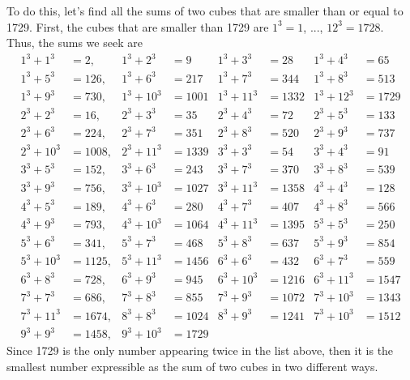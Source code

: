 \begin{solution}
    To do this, let's find all the sums of two cubes that are smaller than or equal to 1729. First, the cubes that are smaller than 1729 are $1^3 = 1$, ..., $12^3 = 1728$. Thus, the sums we seek are
    \begin{align*}
        1^3 + 1^3 &= 2, & 1^3 + 2^3 &= 9 & 1^3 + 3^3 &= 28 & 1^3 + 4^3 &= 65 \\
        1^3 + 5^3 &= 126, & 1^3 + 6^3 &= 217 & 1^3 + 7^3 &= 344 & 1^3 + 8^3 &= 513 \\
        1^3 + 9^3 &= 730, & 1^3 + 10^3 &= 1001 & 1^3 + 11^3 &= 1332 & 1^3 + 12^3 &= 1729 \\
        2^3 + 2^3 &= 16, & 2^3 + 3^3 &= 35 & 2^3 + 4^3 &= 72 & 2^3 + 5^3 &= 133 \\
        2^3 + 6^3 &= 224, & 2^3 + 7^3 &= 351 & 2^3 + 8^3 &= 520 & 2^3 + 9^3 &= 737 \\
        2^3 + 10^3 &= 1008, & 2^3 + 11^3 &= 1339 & 3^3 + 3^3 &= 54 & 3^3 + 4^3 &= 91 \\
        3^3 + 5^3 &= 152, & 3^3 + 6^3 &= 243 & 3^3 + 7^3 &= 370 & 3^3 + 8^3 &= 539 \\
        3^3 + 9^3 &= 756, & 3^3 + 10^3 &= 1027 & 3^3 + 11^3 &= 1358 & 4^3 + 4^3 &= 128 \\
        4^3 + 5^3 &= 189, & 4^3 + 6^3 &= 280 & 4^3 + 7^3 &= 407 & 4^3 + 8^3 &= 566 \\
        4^3 + 9^3 &= 793, & 4^3 + 10^3 &= 1064 & 4^3 + 11^3 &= 1395 & 5^3 + 5^3 &= 250 \\
        5^3 + 6^3 &= 341, & 5^3 + 7^3 &= 468 & 5^3 + 8^3 &= 637 & 5^3 + 9^3 &= 854 \\
        5^3 + 10^3 &= 1125, & 5^3 + 11^3 &= 1456 & 6^3 + 6^3 &= 432 & 6^3 + 7^3 &= 559 \\
        6^3 + 8^3 &= 728, & 6^3 + 9^3 &= 945 & 6^3 + 10^3 &= 1216 & 6^3 + 11^3 &= 1547 \\
        7^3 + 7^3 &= 686, & 7^3 + 8^3 &= 855 & 7^3 + 9^3 &= 1072 & 7^3 + 10^3 &= 1343 \\
        7^3 + 11^3 &= 1674, & 8^3 + 8^3 &= 1024 & 8^3 + 9^3 &= 1241 & 7^3 + 10^3 &= 1512 \\
        9^3 + 9^3 &= 1458, & 9^3 + 10^3 &= 1729 & & & & 
    \end{align*}
    Since 1729 is the only number appearing twice in the list above, then it is the smallest number expressible as the sum of two cubes in two different ways.
\end{solution}